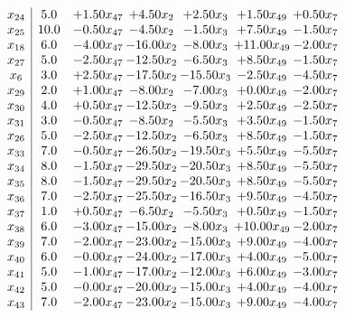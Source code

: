 \documentclass[8pt]{article}
\begin{document}
\[\begin{array}{c| c c@{\hskip 2pt} c@{\hskip 2pt} c@{\hskip 2pt} c@{\hskip 2pt} c@{\hskip 2pt} }
 x_{24}   &  5.0 & +  1.50 x_{47} & +  4.50 x_{2} & +  2.50 x_{3} & +  1.50 x_{49} & +  0.50 x_{7}\\
 x_{25}   &  10.0 & -0.50 x_{47} & -4.50 x_{2} & -1.50 x_{3} & +  7.50 x_{49} & -1.50 x_{7}\\
 x_{18}   &  6.0 & -4.00 x_{47} & -16.00 x_{2} & -8.00 x_{3} & + 11.00 x_{49} & -2.00 x_{7}\\
 x_{27}   &  5.0 & -2.50 x_{47} & -12.50 x_{2} & -6.50 x_{3} & +  8.50 x_{49} & -1.50 x_{7}\\
 x_{6}   &  3.0 & +  2.50 x_{47} & -17.50 x_{2} & -15.50 x_{3} & -2.50 x_{49} & -4.50 x_{7}\\
 x_{29}   &  2.0 & +  1.00 x_{47} & -8.00 x_{2} & -7.00 x_{3} & +  0.00 x_{49} & -2.00 x_{7}\\
 x_{30}   &  4.0 & +  0.50 x_{47} & -12.50 x_{2} & -9.50 x_{3} & +  2.50 x_{49} & -2.50 x_{7}\\
 x_{31}   &  3.0 & -0.50 x_{47} & -8.50 x_{2} & -5.50 x_{3} & +  3.50 x_{49} & -1.50 x_{7}\\
 x_{26}   &  5.0 & -2.50 x_{47} & -12.50 x_{2} & -6.50 x_{3} & +  8.50 x_{49} & -1.50 x_{7}\\
 x_{33}   &  7.0 & -0.50 x_{47} & -26.50 x_{2} & -19.50 x_{3} & +  5.50 x_{49} & -5.50 x_{7}\\
 x_{34}   &  8.0 & -1.50 x_{47} & -29.50 x_{2} & -20.50 x_{3} & +  8.50 x_{49} & -5.50 x_{7}\\
 x_{35}   &  8.0 & -1.50 x_{47} & -29.50 x_{2} & -20.50 x_{3} & +  8.50 x_{49} & -5.50 x_{7}\\
 x_{36}   &  7.0 & -2.50 x_{47} & -25.50 x_{2} & -16.50 x_{3} & +  9.50 x_{49} & -4.50 x_{7}\\
 x_{37}   &  1.0 & +  0.50 x_{47} & -6.50 x_{2} & -5.50 x_{3} & +  0.50 x_{49} & -1.50 x_{7}\\
 x_{38}   &  6.0 & -3.00 x_{47} & -15.00 x_{2} & -8.00 x_{3} & + 10.00 x_{49} & -2.00 x_{7}\\
 x_{39}   &  7.0 & -2.00 x_{47} & -23.00 x_{2} & -15.00 x_{3} & +  9.00 x_{49} & -4.00 x_{7}\\
 x_{40}   &  6.0 & -0.00 x_{47} & -24.00 x_{2} & -17.00 x_{3} & +  4.00 x_{49} & -5.00 x_{7}\\
 x_{41}   &  5.0 & -1.00 x_{47} & -17.00 x_{2} & -12.00 x_{3} & +  6.00 x_{49} & -3.00 x_{7}\\
 x_{42}   &  5.0 & -0.00 x_{47} & -20.00 x_{2} & -15.00 x_{3} & +  4.00 x_{49} & -4.00 x_{7}\\
 x_{43}   &  7.0 & -2.00 x_{47} & -23.00 x_{2} & -15.00 x_{3} & +  9.00 x_{49} & -4.00 x_{7}\\

\end{array}\]
\end{document}
